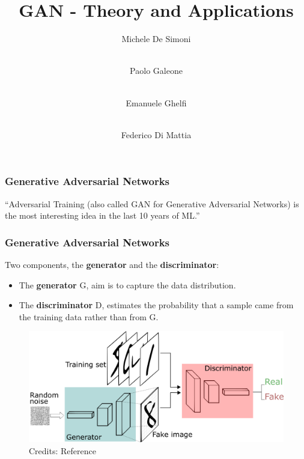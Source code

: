 \documentclass{beamer}
\title[GAN] %
{GAN - Theory and Applications}
\author %
{Michele De Simoni  \and  \\ Paolo Galeone \and \\ Emanuele Ghelfi \and \\ Federico Di Mattia}
\begin{document}
 
{
  \begin{frame}
    \titlepage
  \end{frame}
}

 
\begin{frame}
\frametitle{Generative Adversarial Networks}

\begin{block}{}
	{\large ``Adversarial Training (also called GAN for Generative Adversarial Networks) is the most interesting idea in the last 10 years of ML.''}
	\vskip5mm
	\hspace*{}
\end{block}

\end{frame}

\begin{frame}
\frametitle{Generative Adversarial Networks}
	Two components, the \textbf{generator} and the \textbf{discriminator}:
	\begin{itemize}
		\item The \textbf{generator} G, aim is to capture the data distribution.
		\item The \textbf{discriminator} D, estimates the probability that a sample came from the training data rather than from G.
	\end{itemize}

\begin{figure}
	\includegraphics[width=\textwidth]{GANs.png}
	\caption{Credits: Reference  }
\end{figure}

\end{frame}
\end{document}
